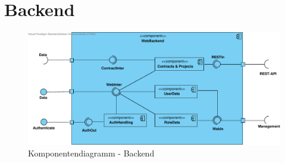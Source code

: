 

\section{Backend}

\begin{figure}[H]
	\centering
	\includegraphics[width=16cm]{img/diagrams/cp_backend.pdf}	
	\caption{Komponentendiagramm - Backend}
	\label{fig:komponentendiagramm-backend}
\end{figure}

